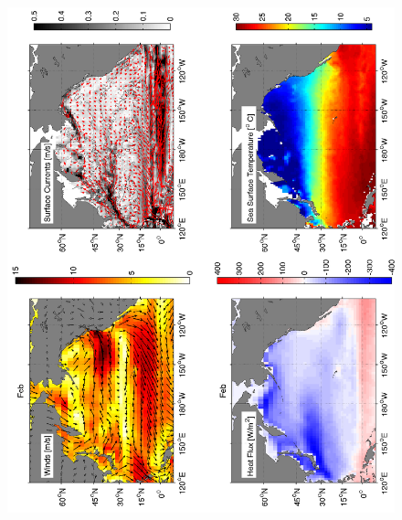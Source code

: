 \begin{figure}[hbt]
  \begin{center}
  \includegraphics[angle=270]{figs/WindOverview/SurfaceCurrents02}
    \caption{}
    \label{fig:}  
  \end{center}
\end{figure}

